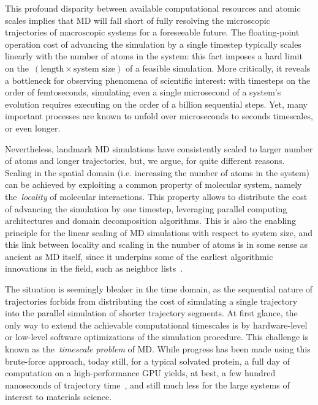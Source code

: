 \noindent   
This profound disparity between available computational resources and atomic scales implies that MD will fall short of fully resolving the microscopic trajectories of macroscopic systems for a foreseeable future.
The floating-point operation cost of advancing the simulation by a single timestep typically scales linearly with the number of atoms in the system: this fact imposes a hard limit on the~$(\text{length}\times\text{system size})$ of a feasible simulation.
More critically, it reveals a bottleneck for observing phenomena of scientific interest: with timesteps on the order of femtoseconds, simulating even a single microsecond of a system's evolution requires executing on the order of a billion sequential steps. Yet, many important processes are known to unfold over microseconds to seconds timescales, or even longer.

Nevertheless, landmark MD simulations have consistently scaled to larger number of atoms and longer trajectories, but, we argue, for quite different reasons. 
Scaling in the spatial domain (i.e. increasing the number of atoms in the system) can be achieved by exploiting a common property of molecular system, namely the~\textit{locality} of molecular interactions. This property allows to distribute the cost of advancing the simulation by one timestep, leveraging parallel computing architectures and domain decomposition algorithms.
This is also the enabling principle for the linear scaling of MD simulations with respect to system size, and this link between locality and scaling in the number of atoms is in some sense as ancient as MD itself, since it underpins some of the earliest algorithmic innovations in the field, such as neighbor lists~\cite{V67}.

The situation is seemingly bleaker in the time domain, as the sequential nature of trajectories forbids from distributing the cost of simulating a single trajectory into the parallel simulation of shorter trajectory segments. At first glance, the only way to extend the achievable computational timescales is by hardware-level or low-level software optimizations of the simulation procedure.
This challenge is known as the~\textit{timescale problem} of MD. While progress has been made using this brute-force approach, today still, for a typical solvated protein, a full day of computation on a high-performance GPU yields, at best, a few hundred nanoseconds of trajectory time~\cite{HD18}, and still much less for the large systems of interest to materials science.

